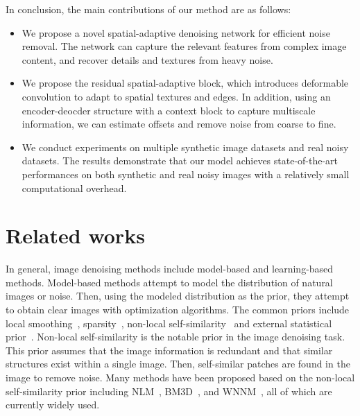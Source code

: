 \documentclass[runningheads]{llncs}
\begin{document}
In conclusion, the main contributions of our method are as follows: 
\begin{itemize}
  \item We propose a novel spatial-adaptive denoising network for efficient noise removal. The network can capture the relevant features from complex image content, and recover details and textures from heavy noise.  
  \item We propose the residual spatial-adaptive block, which introduces deformable convolution to adapt to spatial textures and edges. In addition, using an encoder-deocder structure with a context block to capture multiscale information, we can estimate offsets and remove noise from coarse to fine.
  \item We conduct experiments on multiple synthetic image datasets and real noisy datasets. The results demonstrate that our model achieves state-of-the-art performances on both synthetic and real noisy images with a relatively small computational overhead.
\end{itemize}

\section{Related works}

In general, image denoising methods include model-based and learning-based methods. Model-based methods attempt to model the distribution of natural images or noise. Then, using the modeled distribution as the prior, they attempt to obtain clear images with optimization algorithms. The common priors include local smoothing~\cite{osher2005iterative,xu2007iterative}, sparsity~\cite{aharon2006k,mairal2009non,xu2018trilateral}, non-local self-similarity~\cite{buades2005non,dabov2007image,dabov2007color,xu2017multi,gu2014weighted} and external statistical prior~\cite{zoran2011learning,xu2018external}. Non-local self-similarity is the notable prior in the image denoising task. This prior assumes that the image information is redundant and that similar structures exist within a single image. Then, self-similar patches are found in the image to remove noise. Many methods have been proposed based on the non-local self-similarity prior including NLM~\cite{buades2005non}, BM3D~\cite{dabov2007image,dabov2007color}, and  WNNM~\cite{gu2014weighted,xu2017multi}, all of which are currently widely used.
\end{document}
